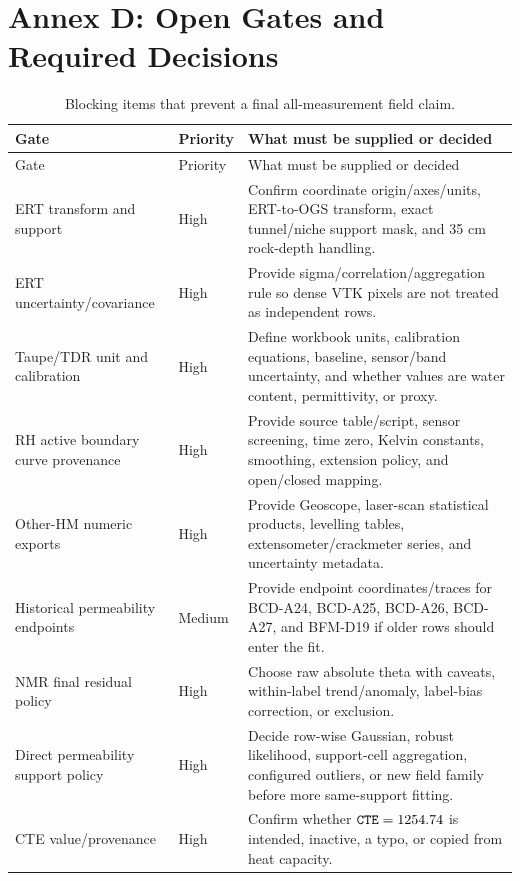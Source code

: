 \documentclass[10pt,a4paper]{article}
\newcommand{\code}[1]{\texttt{\detokenize{#1}}}
\begin{document}
\section{Annex D: Open Gates and Required Decisions}

\begin{longtable}{@{}L{0.24\textwidth}L{0.16\textwidth}Y@{}}
\caption{Blocking items that prevent a final all-measurement field claim.}\\
\toprule
Gate & Priority & What must be supplied or decided \\
\midrule
\endfirsthead
\toprule
Gate & Priority & What must be supplied or decided \\
\midrule
\endhead
\bottomrule
\endlastfoot
ERT transform and support & High & Confirm coordinate origin/axes/units, ERT-to-OGS transform, exact tunnel/niche support mask, and 35 cm rock-depth handling. \\
ERT uncertainty/covariance & High & Provide sigma/correlation/aggregation rule so dense VTK pixels are not treated as independent rows. \\
Taupe/TDR unit and calibration & High & Define workbook units, calibration equations, baseline, sensor/band uncertainty, and whether values are water content, permittivity, or proxy. \\
RH active boundary curve provenance & High & Provide source table/script, sensor screening, time zero, Kelvin constants, smoothing, extension policy, and open/closed mapping. \\
Other-HM numeric exports & High & Provide Geoscope, laser-scan statistical products, levelling tables, extensometer/crackmeter series, and uncertainty metadata. \\
Historical permeability endpoints & Medium & Provide endpoint coordinates/traces for BCD-A24, BCD-A25, BCD-A26, BCD-A27, and BFM-D19 if older rows should enter the fit. \\
NMR final residual policy & High & Choose raw absolute theta with caveats, within-label trend/anomaly, label-bias correction, or exclusion. \\
Direct permeability support policy & High & Decide row-wise Gaussian, robust likelihood, support-cell aggregation, configured outliers, or new field family before more same-support fitting. \\
CTE value/provenance & High & Confirm whether \(\code{CTE}=1254.74\) is intended, inactive, a typo, or copied from heat capacity. \\
\end{longtable}
\end{document}
